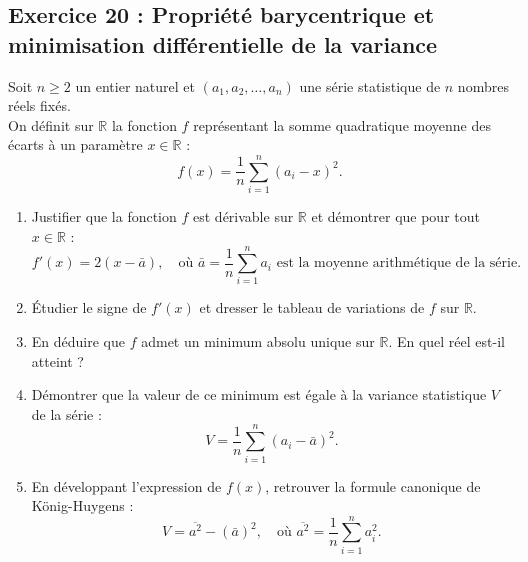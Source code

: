 \documentclass[11pt,a4paper]{article}
\newcommand{\R}{\mathbb{R}}
\begin{document}
\subsection*{Exercice 20 : Propriété barycentrique et minimisation différentielle de la variance}

Soit $n \ge 2$ un entier naturel et $(a_1, a_2, \dots, a_n)$ une série statistique de $n$ nombres réels fixés.\\
On définit sur $\R$ la fonction $f$ représentant la somme quadratique moyenne des écarts à un paramètre $x \in \R$ :
\[
f(x) = \frac{1}{n} \sum_{i=1}^n (a_i - x)^2.
\]
\begin{enumerate}[label=\textbf{\arabic*.}]
    \item Justifier que la fonction $f$ est dérivable sur $\R$ et démontrer que pour tout $x \in \R$ :
    \[
    f'(x) = 2(x - \bar{a}), \quad \text{où } \bar{a} = \frac{1}{n} \sum_{i=1}^n a_i \text{ est la moyenne arithmétique de la série}.
    \]
    \item Étudier le signe de $f'(x)$ et dresser le tableau de variations de $f$ sur $\R$.
    \item En déduire que $f$ admet un minimum absolu unique sur $\R$. En quel réel est-il atteint ?
    \item Démontrer que la valeur de ce minimum est égale à la variance statistique $V$ de la série :
    \[
    V = \frac{1}{n} \sum_{i=1}^n (a_i - \bar{a})^2.
    \]
    \item En développant l'expression de $f(x)$, retrouver la formule canonique de König-Huygens :
    \[
    V = \overline{a^2} - (\bar{a})^2, \quad \text{où } \overline{a^2} = \frac{1}{n} \sum_{i=1}^n a_i^2.
    \]
\end{enumerate}
\end{document}
